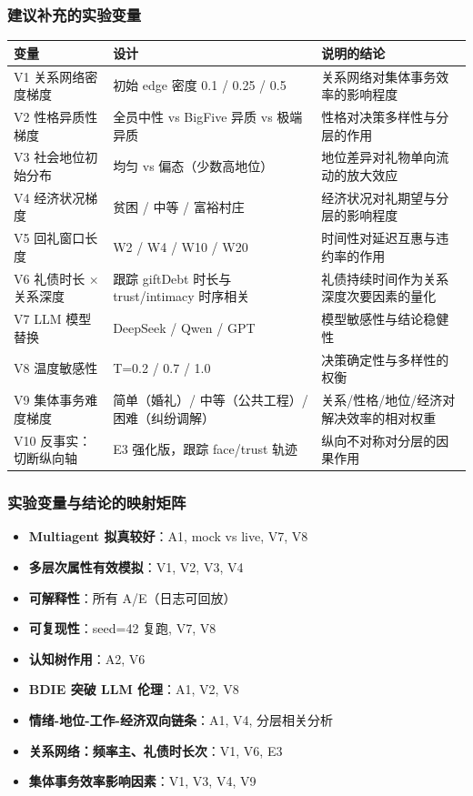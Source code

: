 \documentclass[AutoFakeBold,AutoFakeSlant]{beamer}
\begin{document}
\begin{frame}
    \frametitle{建议补充的实验变量}
    \tiny
    \begin{tabularx}{\textwidth}{|l|X|X|}
        \toprule
        \textbf{变量} & \textbf{设计} & \textbf{说明的结论} \\
        \midrule
        V1 关系网络密度梯度 & 初始 edge 密度 0.1 / 0.25 / 0.5 & 关系网络对集体事务效率的影响程度 \\
        \midrule
        V2 性格异质性梯度 & 全员中性 vs BigFive 异质 vs 极端异质 & 性格对决策多样性与分层的作用 \\
        \midrule
        V3 社会地位初始分布 & 均匀 vs 偏态（少数高地位） & 地位差异对礼物单向流动的放大效应 \\
        \midrule
        V4 经济状况梯度 & 贫困 / 中等 / 富裕村庄 & 经济状况对礼期望与分层的影响程度 \\
        \midrule
        V5 回礼窗口长度 & W2 / W4 / W10 / W20 & 时间性对延迟互惠与违约率的作用 \\
        \midrule
        V6 礼债时长 × 关系深度 & 跟踪 giftDebt 时长与 trust/intimacy 时序相关 & 礼债持续时间作为关系深度次要因素的量化 \\
        \midrule
        V7 LLM 模型替换 & DeepSeek / Qwen / GPT & 模型敏感性与结论稳健性 \\
        \midrule
        V8 温度敏感性 & T=0.2 / 0.7 / 1.0 & 决策确定性与多样性的权衡 \\
        \midrule
        V9 集体事务难度梯度 & 简单（婚礼）/ 中等（公共工程）/ 困难（纠纷调解） & 关系/性格/地位/经济对解决效率的相对权重 \\
        \midrule
        V10 反事实：切断纵向轴 & E3 强化版，跟踪 face/trust 轨迹 & 纵向不对称对分层的因果作用 \\
        \bottomrule
    \end{tabularx}
\end{frame}

\begin{frame}
    \frametitle{实验变量与结论的映射矩阵}
    \scriptsize
    \begin{itemize}
        \item \textbf{Multiagent 拟真较好}：A1, mock vs live, V7, V8
        \item \textbf{多层次属性有效模拟}：V1, V2, V3, V4
        \item \textbf{可解释性}：所有 A/E（日志可回放）
        \item \textbf{可复现性}：seed=42 复跑, V7, V8
        \item \textbf{认知树作用}：A2, V6
        \item \textbf{BDIE 突破 LLM 伦理}：A1, V2, V8
        \item \textbf{情绪-地位-工作-经济双向链条}：A1, V4, 分层相关分析
        \item \textbf{关系网络：频率主、礼债时长次}：V1, V6, E3
        \item \textbf{集体事务效率影响因素}：V1, V3, V4, V9
    \end{itemize}
\end{frame}
\end{document}
